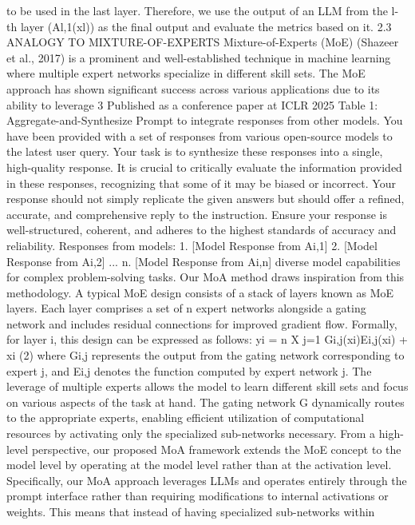 to be used in the last layer. Therefore, we use the output of an LLM from the l-th layer (Al,1(xl)) as
the final output and evaluate the metrics based on it.
2.3
ANALOGY TO MIXTURE-OF-EXPERTS
Mixture-of-Experts (MoE) (Shazeer et al., 2017) is a prominent and well-established technique
in machine learning where multiple expert networks specialize in different skill sets. The MoE
approach has shown significant success across various applications due to its ability to leverage
3
Published as a conference paper at ICLR 2025
Table 1: Aggregate-and-Synthesize Prompt to integrate responses from other models.
You have been provided with a set of responses from various open-source models to the latest user query. Your
task is to synthesize these responses into a single, high-quality response. It is crucial to critically evaluate the
information provided in these responses, recognizing that some of it may be biased or incorrect. Your response
should not simply replicate the given answers but should offer a refined, accurate, and comprehensive reply
to the instruction. Ensure your response is well-structured, coherent, and adheres to the highest standards of
accuracy and reliability.
Responses from models:
1. [Model Response from Ai,1]
2. [Model Response from Ai,2]
...
n. [Model Response from Ai,n]
diverse model capabilities for complex problem-solving tasks. Our MoA method draws inspiration
from this methodology.
A typical MoE design consists of a stack of layers known as MoE layers. Each layer comprises a
set of n expert networks alongside a gating network and includes residual connections for improved
gradient flow. Formally, for layer i, this design can be expressed as follows:
yi =
n
X
j=1
Gi,j(xi)Ei,j(xi) + xi
(2)
where Gi,j represents the output from the gating network corresponding to expert j, and Ei,j denotes
the function computed by expert network j. The leverage of multiple experts allows the model to
learn different skill sets and focus on various aspects of the task at hand. The gating network G
dynamically routes to the appropriate experts, enabling efficient utilization of computational resources
by activating only the specialized sub-networks necessary.
From a high-level perspective, our proposed MoA framework extends the MoE concept to the model
level by operating at the model level rather than at the activation level. Specifically, our MoA approach
leverages LLMs and operates entirely through the prompt interface rather than requiring modifications
to internal activations or weights. This means that instead of having specialized sub-networks within
